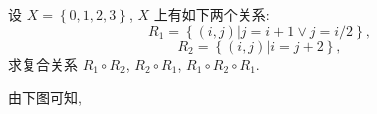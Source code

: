 \documentclass[10pt,UTF8]{book} %
\begin{document}
\begin{exercise}
    设 $X = \left\{ 0, 1, 2, 3 \right\}$,
    $X$ 上有如下两个关系:
    \[ R_1 = \left\{ (i,j) | j = i+1 \vee j = i/2 \right\}, \]
    \[ R_2 = \left\{ (i,j) | i = j+2 \right\}, \]
    求复合关系 $R_1 \circ R_2$, $R_2 \circ R_1$, $R_1 \circ R_2 \circ R_1$.
    \begin{sol}
        由下图可知,
        \begin{figure}[H]
            \centering



            \begin{tikzpicture}[x=0.75pt,y=0.75pt,yscale=-1,xscale=1]
            

\end{tikzpicture}
\end{figure}
\end{sol}
\end{exercise}
\end{document}
